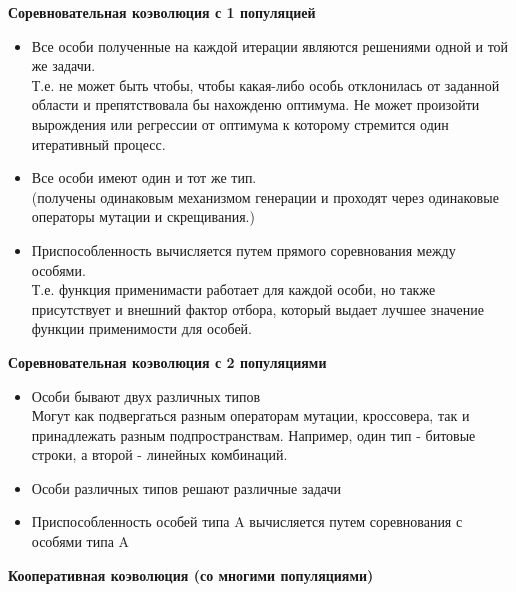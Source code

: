 \textbf{Соревновательная коэволюция с 1 популяцией}
\begin{itemize}
    \item Все особи полученные на каждой итерации являются решениями одной и той же задачи. \\
    Т.е. не может быть чтобы, чтобы какая-либо особь отклонилась от заданной области и препятствовала бы нахожденю оптимума. Не может произойти вырождения или регрессии от оптимума к которому стремится один итеративный процесс.
    \item Все особи имеют один и тот же тип.\\
    (получены одинаковым механизмом генерации и проходят через одинаковые операторы мутации и скрещивания.)
    \item Приспособленность вычисляется путем прямого соревнования между особями.\\
    Т.е. функция применимасти работает для каждой особи, но также присутствует и внешний фактор отбора, который выдает лучшее значение функции применимости для особей.
\end{itemize}
\textbf{Соревновательная коэволюция с 2 популяциями}
\begin{itemize}
    \item Особи бывают двух различных типов\\
    Могут как подвергаться разным операторам мутации, кроссовера, так и принадлежать разным подпространствам. Например, один тип - битовые строки, а второй - линейных комбинаций.
    \item Особи различных типов решают различные задачи
    \item Приспособленность особей типа A вычисляется путем соревнования с особями типа A
\end{itemize}
\textbf{Кооперативная коэволюция (со многими популяциями)}

